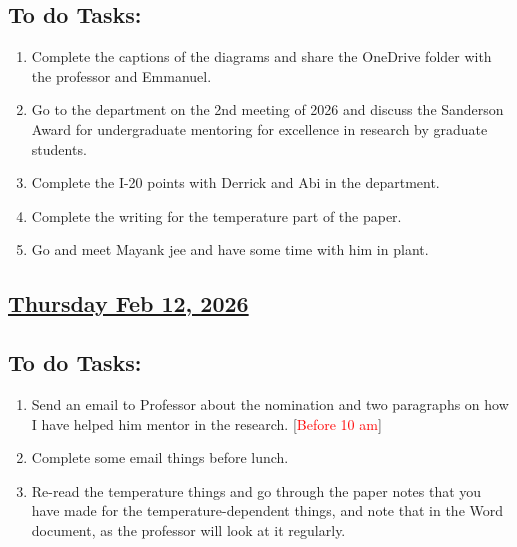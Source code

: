\subsection*{To do Tasks:}
\begin{enumerate}
      \item Complete the captions of the diagrams and share the OneDrive folder with the professor and Emmanuel. \cmark
      \item Go to the department on the 2nd meeting of 2026 and discuss the Sanderson Award for undergraduate mentoring for excellence in research by graduate students. \cmark
      \item Complete the I-20 points with Derrick and Abi in the department. \cmark
      \item Complete the writing for the temperature part of the paper. \xmark
      \item Go and meet Mayank jee and have some time with him in plant. \xmark
\end{enumerate}
\subsection*{\underline{Thursday Feb 12, 2026}}
\subsection*{To do Tasks:}
\begin{enumerate}
    \item Send an email to Professor about the nomination and two paragraphs on how I have helped him mentor in the research. [\textcolor{red}{Before 10 am}] \cmark
    \item Complete some email things before lunch. \cmark
    \item Re-read the temperature things and go through the paper notes that you have made for the temperature-dependent things, and note that in the Word document, as the professor will look at it regularly.
\end{enumerate}
